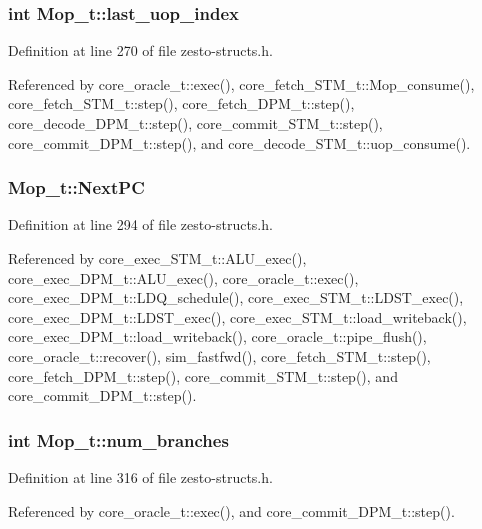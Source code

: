 \subsubsection[{last\_\-uop\_\-index}]{\setlength{\rightskip}{0pt plus 5cm}int {\bf Mop\_\-t::last\_\-uop\_\-index}}\label{structMop__t_82638df3748d18d1c8c2e3d58d077a49}




Definition at line 270 of file zesto-structs.h.

Referenced by core\_\-oracle\_\-t::exec(), core\_\-fetch\_\-STM\_\-t::Mop\_\-consume(), core\_\-fetch\_\-STM\_\-t::step(), core\_\-fetch\_\-DPM\_\-t::step(), core\_\-decode\_\-DPM\_\-t::step(), core\_\-commit\_\-STM\_\-t::step(), core\_\-commit\_\-DPM\_\-t::step(), and core\_\-decode\_\-STM\_\-t::uop\_\-consume().
\subsubsection[{NextPC}]{ {\bf Mop\_\-t::NextPC}}\label{structMop__t_56859cbd74e3f756c4b2ef9f573fe642}




Definition at line 294 of file zesto-structs.h.

Referenced by core\_\-exec\_\-STM\_\-t::ALU\_\-exec(), core\_\-exec\_\-DPM\_\-t::ALU\_\-exec(), core\_\-oracle\_\-t::exec(), core\_\-exec\_\-DPM\_\-t::LDQ\_\-schedule(), core\_\-exec\_\-STM\_\-t::LDST\_\-exec(), core\_\-exec\_\-DPM\_\-t::LDST\_\-exec(), core\_\-exec\_\-STM\_\-t::load\_\-writeback(), core\_\-exec\_\-DPM\_\-t::load\_\-writeback(), core\_\-oracle\_\-t::pipe\_\-flush(), core\_\-oracle\_\-t::recover(), sim\_\-fastfwd(), core\_\-fetch\_\-STM\_\-t::step(), core\_\-fetch\_\-DPM\_\-t::step(), core\_\-commit\_\-STM\_\-t::step(), and core\_\-commit\_\-DPM\_\-t::step().
\subsubsection[{num\_\-branches}]{\setlength{\rightskip}{0pt plus 5cm}int {\bf Mop\_\-t::num\_\-branches}}\label{structMop__t_3112da7835a7592682fa3c358e9d3cad}




Definition at line 316 of file zesto-structs.h.

Referenced by core\_\-oracle\_\-t::exec(), and core\_\-commit\_\-DPM\_\-t::step().
